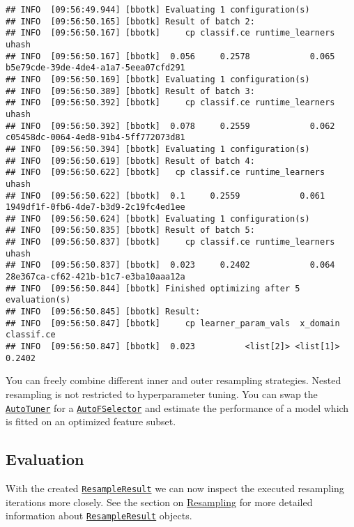 \documentclass[
]{scrbook}
\begin{document}
\begin{verbatim}
## INFO  [09:56:49.944] [bbotk] Evaluating 1 configuration(s) 
## INFO  [09:56:50.165] [bbotk] Result of batch 2: 
## INFO  [09:56:50.167] [bbotk]     cp classif.ce runtime_learners                                uhash 
## INFO  [09:56:50.167] [bbotk]  0.056     0.2578            0.065 b5e79cde-39de-4de4-a1a7-5eea07cfd291 
## INFO  [09:56:50.169] [bbotk] Evaluating 1 configuration(s) 
## INFO  [09:56:50.389] [bbotk] Result of batch 3: 
## INFO  [09:56:50.392] [bbotk]     cp classif.ce runtime_learners                                uhash 
## INFO  [09:56:50.392] [bbotk]  0.078     0.2559            0.062 c05458dc-0064-4ed8-91b4-5ff772073d81 
## INFO  [09:56:50.394] [bbotk] Evaluating 1 configuration(s) 
## INFO  [09:56:50.619] [bbotk] Result of batch 4: 
## INFO  [09:56:50.622] [bbotk]   cp classif.ce runtime_learners                                uhash 
## INFO  [09:56:50.622] [bbotk]  0.1     0.2559            0.061 1949df1f-0fb6-4de7-b3d9-2c19fc4ed1ee 
## INFO  [09:56:50.624] [bbotk] Evaluating 1 configuration(s) 
## INFO  [09:56:50.835] [bbotk] Result of batch 5: 
## INFO  [09:56:50.837] [bbotk]     cp classif.ce runtime_learners                                uhash 
## INFO  [09:56:50.837] [bbotk]  0.023     0.2402            0.064 28e367ca-cf62-421b-b1c7-e3ba10aaa12a 
## INFO  [09:56:50.844] [bbotk] Finished optimizing after 5 evaluation(s) 
## INFO  [09:56:50.845] [bbotk] Result: 
## INFO  [09:56:50.847] [bbotk]     cp learner_param_vals  x_domain classif.ce 
## INFO  [09:56:50.847] [bbotk]  0.023          <list[2]> <list[1]>     0.2402
\end{verbatim}

You can freely combine different inner and outer resampling strategies.
Nested resampling is not restricted to hyperparameter tuning.
You can swap the \href{https://mlr3tuning.mlr-org.com/reference/AutoTuner.html}{\texttt{AutoTuner}} for a \href{https://mlr3fselect.mlr-org.com/reference/AutoFSelector.html}{\texttt{AutoFSelector}} and estimate the performance of a model which is fitted on an optimized feature subset.

\hypertarget{nested-resamp-eval}{%
\subsection{Evaluation}\label{nested-resamp-eval}}

With the created \href{https://mlr3.mlr-org.com/reference/ResampleResult.html}{\texttt{ResampleResult}} we can now inspect the executed resampling iterations more closely.
See the section on \protect\hyperlink{resampling}{Resampling} for more detailed information about \href{https://mlr3.mlr-org.com/reference/ResampleResult.html}{\texttt{ResampleResult}} objects.
\end{document}
